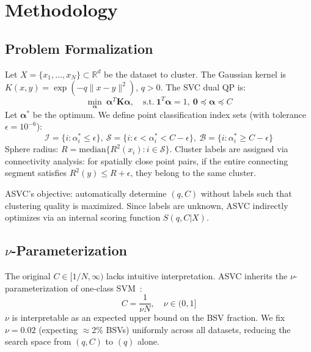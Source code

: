 \section{Methodology}

\subsection{Problem Formalization}

Let $X\!=\!\{x_1,\dots,x_N\}\!\subset\!\mathbb{R}^d$ be the dataset to cluster. The Gaussian kernel is $K(x,y)\!=\!\exp(-q\|x\!-\!y\|^2)$, $q\!>\!0$. The SVC dual QP is:
\begin{equation}
\min_{\bm{\alpha}}\ \bm{\alpha}^T\mathbf{K}\bm{\alpha},\quad \text{s.t.}\ \mathbf{1}^T\bm{\alpha}=1,\ \mathbf{0}\preceq\bm{\alpha}\preceq C \label{eq:dual}
\end{equation}
Let $\bm{\alpha}^*$ be the optimum. We define point classification index sets (with tolerance $\epsilon=10^{-6}$):
\begin{equation}
\mathcal{I}\!=\!\{i:\alpha^*_i\!\leq\!\epsilon\},\ \mathcal{S}\!=\!\{i:\epsilon\!<\!\alpha^*_i\!<\!C\!-\!\epsilon\},\ \mathcal{B}\!=\!\{i:\alpha^*_i\!\geq\!C\!-\!\epsilon\}
\end{equation}
Sphere radius: $R\!=\!\text{median}\{R^2(x_i):i\!\in\!\mathcal{S}\}$. Cluster labels are assigned via connectivity analysis: for spatially close point pairs, if the entire connecting segment satisfies $R^2(y)\!\leq\!R\!+\!\epsilon$, they belong to the same cluster.

ASVC's objective: automatically determine $(q,C)$ without labels such that clustering quality is maximized. Since labels are unknown, ASVC indirectly optimizes via an internal scoring function $S(q,C|X)$.

\subsection{\texorpdfstring{$\nu$}{nu}-Parameterization}

The original $C\!\in\![1/N,\infty)$ lacks intuitive interpretation. ASVC inherits the $\nu$-parameterization of one-class SVM~\cite{scholkopf2001}:
\begin{equation}
C=\frac{1}{\nu N},\quad \nu\in(0,1]
\end{equation}
$\nu$ is interpretable as an expected upper bound on the BSV fraction. We fix $\nu\!=\!0.02$ (expecting $\approx$2\% BSVs) uniformly across all datasets, reducing the search space from $(q,C)$ to $(q)$ alone.

